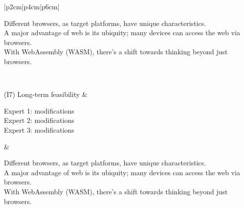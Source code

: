 \begin{table}[h]
\begin{tabular}{|p{2cm}|p{4cm}|p{6cm}|}
\begin{minipage}[t]{\linewidth}
\textbullet Different browsers, as target platforms, have unique characteristics.\\
\textbullet A major advantage of web is its ubiquity; many devices can access the web via browsers.\\
\textbullet With WebAssembly (WASM), there's a shift towards thinking beyond just browsers.

\vspace{5pt}
\end{minipage}
\\ 
\hline


(I7) Long-term feasibility
& 
\begin{minipage}[t]{\linewidth}
Expert 1: modifications\\
Expert 2: modifications\\ 
Expert 3: modifications
\end{minipage}&

\begin{minipage}[t]{\linewidth}
\textbullet Different browsers, as target platforms, have unique characteristics.\\
\textbullet A major advantage of web is its ubiquity; many devices can access the web via browsers.\\
\textbullet With WebAssembly (WASM), there's a shift towards thinking beyond just browsers.

\vspace{5pt}
\end{minipage}
\\ 
\hline


\end{tabular}
\caption{Expert evaluation of criteria for cross-platform development frameworks}
\label{tab:my_label}
\end{table}

